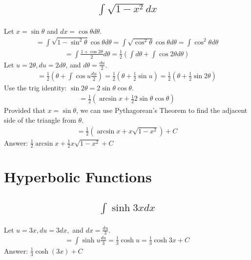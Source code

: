 \documentclass{article}
\begin{document}
\subsection{
	\begin{align*}
		\int{\sqrt{1 - x^2} dx}
	\end{align*}
}
Let $x = \sin{\theta}$ and $dx = \cos{\theta}d\theta$. 
\begin{align*}
	=  \int{\sqrt{1 - \sin^2{\theta}}\cos{\theta}d\theta} = \int{\sqrt{\cos^2{\theta}}\cos{\theta}d\theta} = \int{\cos^2{\theta}d\theta}
\end{align*}
\begin{align*}
	= \int{\frac{1 + \cos{2\theta}}{2} d\theta} = \frac{1}{2} \left( \int{d\theta} + \int{\cos{2\theta}d\theta} \right) 
\end{align*}
Let $u = 2\theta, du = 2d\theta$, and $d\theta = \frac{du}{2}$.
\begin{align*}
	= \frac{1}{2} \left( \theta + \int{\cos{u} \frac{du}{2}} \right) = \frac{1}{2} \left( \theta + \frac{1}{2}\sin{u} \right) = \frac{1}{2} \left( \theta + \frac{1}{2}\sin{2\theta} \right)
\end{align*}
Use the trig identity: $\sin{2\theta} = 2\sin{\theta}\cos{\theta}$.
\begin{align*}
	= \frac{1}{2} \left( \arcsin{x} + \frac{1}{2}2\sin{\theta}\cos{\theta} \right)
\end{align*}
Provided that $x = \sin{\theta}$, we can use Pythagorean's Theorem to find the adjacent side of the triangle from $\theta$.
\begin{align*}
	= \frac{1}{2} \left( \arcsin{x} + x \sqrt{1 - x^2} \right) + C
\end{align*}
Answer: $\frac{1}{2} \arcsin{x} + \frac{1}{2}x \sqrt{1 - x^2} + C$

\section{Hyperbolic Functions}
\subsection{
	\begin{align*}
		\int{\sinh{3x} dx}
	\end{align*}
}
Let $u = 3x, du = 3dx,$ and $dx = \frac{du}{3}$.
\begin{align*}
	= \int{\sinh{u} \frac{du}{3}} = \frac{1}{3} \cosh{u} = \frac{1}{3} \cosh{3x} + C
\end{align*}
Answer: $\frac{1}{3} \cosh{(3x)} + C$
\end{document}
